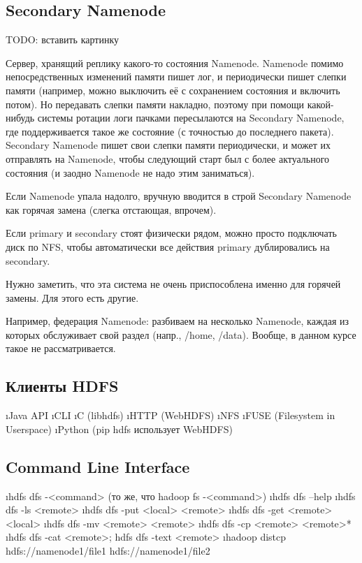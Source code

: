 \subsection{Secondary Namenode}
TODO: вставить картинку

Сервер, хранящий реплику какого-то состояния Namenode.
Namenode помимо непосредственных изменений памяти пишет лог, и периодически пишет слепки памяти (например, можно выключить её с сохранением состояния и включить потом). Но передавать слепки памяти накладно, поэтому при помощи какой-нибудь системы ротации логи пачками пересылаются на Secondary Namenode, где поддерживается такое же состояние (с точностью до последнего пакета). Secondary Namenode пишет свои слепки памяти периодически, и может их отправлять на Namenode, чтобы следующий старт был с более актуального состояния (и заодно Namenode не надо этим заниматься).

Если Namenode упала надолго, вручную вводится в строй Secondary Namenode как горячая замена (слегка отстающая, впрочем).

Если primary и secondary стоят физически рядом, можно просто подключать диск по NFS, чтобы автоматически все действия primary дублировались на secondary.

Нужно заметить, что эта система не очень приспособлена именно для горячей замены. Для этого есть другие.

Например, федерация Namenode: разбиваем на несколько Namenode, каждая из которых обслуживает свой раздел (напр., /home, /data). Вообще, в данном курсе такое не рассматривается.

\subsection{Клиенты HDFS}
\begin{itemize}
\i Java API
\i CLI
\i C (libhdfs)
\i HTTP (WebHDFS)
\i NFS
\i FUSE (Filesystem in Userspace)
\i Python (pip hdfs использует WebHDFS)
\end{itemize}

\subsection{Command Line Interface}
\begin{itemize}
\i hdfs dfs -<command>
(то же, что hadoop fs -<command>)
\i hdfs dfs –help
\i hdfs dfs -ls <remote>
\i hdfs dfs -put <local> <remote>
\i hdfs dfs -get <remote> <local>
\i hdfs dfs -mv <remote> <remote>
\i hdfs dfs -cp <remote> <remote>*
\i hdfs dfs -cat <remote>; hdfs dfs -text <remote>
\i hadoop distcp hdfs://namenode1/file1 hdfs://namenode1/file2
\end{itemize}

